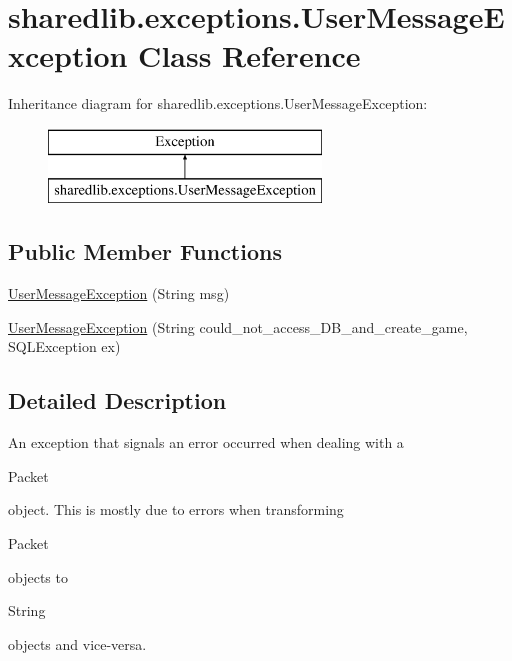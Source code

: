 \hypertarget{classsharedlib_1_1exceptions_1_1_user_message_exception}{}\section{sharedlib.\+exceptions.\+User\+Message\+Exception Class Reference}
\label{classsharedlib_1_1exceptions_1_1_user_message_exception}
Inheritance diagram for sharedlib.\+exceptions.\+User\+Message\+Exception\+:\begin{figure}[H]
\begin{center}
\leavevmode
\includegraphics[height=2.000000cm]{classsharedlib_1_1exceptions_1_1_user_message_exception}
\end{center}
\end{figure}
\subsection*{Public Member Functions}
\begin{DoxyCompactItemize}
\item 
\hyperlink{classsharedlib_1_1exceptions_1_1_user_message_exception_a0f783721b5137a3a012b185c2fa96f44}{User\+Message\+Exception} (String msg)
\item 
\hyperlink{classsharedlib_1_1exceptions_1_1_user_message_exception_a7d3408c95f16dcd17d9048f3be5511d0}{User\+Message\+Exception} (String could\+\_\+not\+\_\+access\+\_\+\+D\+B\+\_\+and\+\_\+create\+\_\+game, S\+Q\+L\+Exception ex)
\end{DoxyCompactItemize}


\subsection{Detailed Description}
An exception that signals an error occurred when dealing with a 
\begin{DoxyCode}
Packet 
\end{DoxyCode}
 object. This is mostly due to errors when transforming 
\begin{DoxyCode}
Packet 
\end{DoxyCode}
 objects to
\begin{DoxyCode}
String 
\end{DoxyCode}
 objects and vice-\/versa.

